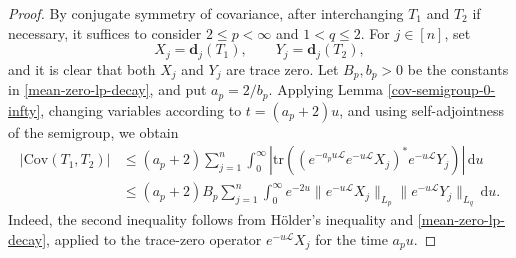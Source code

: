 \documentclass{amsbook}
\theoremstyle{definition}
\theoremstyle{remark}
\numberwithin{section}{chapter}
\numberwithin{equation}{chapter}
\newcommand{\1}{\mathbf{1}}
\newcommand{\tr}{\mathrm{tr}}
\newcommand{\dc}{\mathbf{d}}
\begin{document}
\begin{proof}
By conjugate symmetry of covariance, after interchanging $T_{1}$ and $T_{2}$
if necessary, it suffices to consider $2\leq p<\infty$ and $1<q\leq2$.
For $j\in[n]$, set
\[
X_{j}=\dc_{j}(T_{1}), \qquad Y_{j}=\dc_{j}(T_{2}),
\]
and it is clear that both $X_{j}$ and $Y_{j}$ are trace zero.  Let $B_{p},b_{p}>0$ be the
constants in \eqref{mean-zero-lp-decay}, and put $a_{p}=2/b_{p}$.  Applying
Lemma \ref{cov-semigroup-0-infty}, changing variables according to
$t=(a_{p}+2)u$, and using self-adjointness of the semigroup, we obtain
\begin{align*}
\big|\mathrm{Cov}(T_{1},T_{2})\big|
&\leq (a_{p}+2)\sum_{j=1}^{n}\int_{0}^{\infty}
 \left|\tr\!\left(
  (e^{-a_{p}u\mathcal{L}}e^{-u\mathcal{L}}X_{j})^{*}
   e^{-u\mathcal{L}}Y_{j}
 \right)\right|\,\mathrm{d}u\\
&\leq (a_{p}+2)B_{p}\sum_{j=1}^{n}\int_{0}^{\infty}e^{-2u}
 \|e^{-u\mathcal{L}}X_{j}\|_{L_{p}}
 \|e^{-u\mathcal{L}}Y_{j}\|_{L_{q}}\,\mathrm{d}u.
\end{align*}
Indeed, the second inequality follows from H\"older's inequality and
\eqref{mean-zero-lp-decay}, applied to the trace-zero operator
$e^{-u\mathcal{L}}X_{j}$ for the time $a_{p}u$.


\end{proof}
\end{document}
